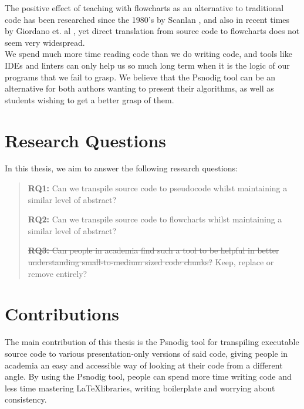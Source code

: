 The positive effect of teaching with flowcharts as an alternative to traditional code has been researched since the 1980's by Scanlan \cite{DBLP:journals/software/Scanlan89}, and also in recent times by Giordano et. al \cite{7096016}, yet direct translation from source code to flowcharts does not seem very widespread. \hfill \\

We spend much more time reading code than we do writing code\cite[14]{martin2008clean}, and tools like IDEs and linters can only help us so much long term when it is the logic of our programs that we fail to grasp. We believe that the Psnodig tool can be an alternative for both authors wanting to present their algorithms, as well as students wishing to get a better grasp of them.


\section{Research Questions}

In this thesis, we aim to answer the following research questions: \hfill \\

\begin{quote}
    \textbf{RQ1:} Can we transpile source code to pseudocode whilst maintaining a similar level of abstract?

    \textbf{RQ2:} Can we transpile source code to flowcharts whilst maintaining a similar level of abstract?

    \sout{\textbf{RQ3:} Can people in academia find such a tool to be helpful in better understanding small-to-medium sized code chunks?} Keep, replace or remove entirely?
\end{quote}

\section{Contributions}

The main contribution of this thesis is the Psnodig tool for transpiling executable source code to various presentation-only versions of said code, giving people in academia an easy and accessible way of looking at their code from a different angle. By using the Psnodig tool, people can spend more time writing code and less time mastering \LaTeX libraries, writing boilerplate and worrying about consistency. \hfill \\

